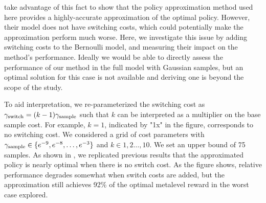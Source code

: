 \citet{callaway2018learning} take advantage of this fact to show that the policy approximation method used here provides a highly-accurate approximation of the optimal policy. However, their model does not have switching costs, which could potentially make the approximation perform much worse. Here, we investigate this issue by adding switching costs to the Bernoulli model, and measuring their impact on the method's performance. Ideally we would be able to directly assess the performance of our method in the full model with Gaussian samples, but an optimal solution for this case is not available and deriving one is beyond the scope of the study.


To aid interpretation, we re-parameterized the switching cost as $\gamma_\text{switch} = (k - 1)\gamma_\text{sample}$ such that $k$ can be interpreted as a multiplier on the base sample cost. For example, $k=1$, indicated by "1x" in the figure, corresponds to no switching cost. We considered a grid of cost parameters with $\gamma_\text{sample} \in \{e^{-9}, e^{-8}, \dots, e^{-3}\}$ and $k \in {1, 2 \dots, 10}$. We set an upper bound of 75 samples. As shown in , we replicated previous results that the approximated policy is nearly optimal when there is no switch cost. As the figure shows, relative performance degrades somewhat when switch costs are added, but the approximation still achieves 92\% of the optimal metalevel reward in the worst case explored.




